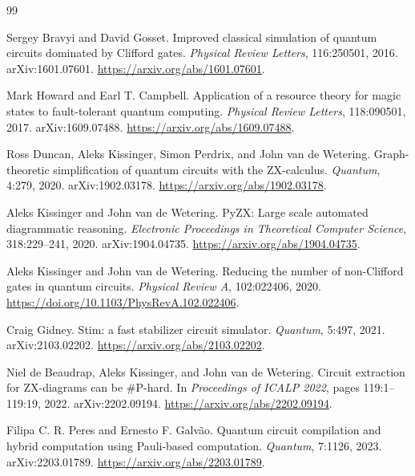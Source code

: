 \documentclass[11pt]{article}
\theoremstyle{remark}
\begin{document}
\begin{thebibliography}{99}

Sergey Bravyi and David Gosset.
\newblock Improved classical simulation of quantum circuits dominated by Clifford gates.
\newblock \emph{Physical Review Letters}, 116:250501, 2016.
\newblock arXiv:1601.07601.
\newblock \url{https://arxiv.org/abs/1601.07601}.

Mark Howard and Earl T. Campbell.
\newblock Application of a resource theory for magic states to fault-tolerant quantum computing.
\newblock \emph{Physical Review Letters}, 118:090501, 2017.
\newblock arXiv:1609.07488.
\newblock \url{https://arxiv.org/abs/1609.07488}.

Ross Duncan, Aleks Kissinger, Simon Perdrix, and John van de Wetering.
\newblock Graph-theoretic simplification of quantum circuits with the ZX-calculus.
\newblock \emph{Quantum}, 4:279, 2020.
\newblock arXiv:1902.03178.
\newblock \url{https://arxiv.org/abs/1902.03178}.

Aleks Kissinger and John van de Wetering.
\newblock PyZX: Large scale automated diagrammatic reasoning.
\newblock \emph{Electronic Proceedings in Theoretical Computer Science}, 318:229--241, 2020.
\newblock arXiv:1904.04735.
\newblock \url{https://arxiv.org/abs/1904.04735}.

Aleks Kissinger and John van de Wetering.
\newblock Reducing the number of non-Clifford gates in quantum circuits.
\newblock \emph{Physical Review A}, 102:022406, 2020.
\newblock \url{https://doi.org/10.1103/PhysRevA.102.022406}.

Craig Gidney.
\newblock Stim: a fast stabilizer circuit simulator.
\newblock \emph{Quantum}, 5:497, 2021.
\newblock arXiv:2103.02202.
\newblock \url{https://arxiv.org/abs/2103.02202}.

Niel de Beaudrap, Aleks Kissinger, and John van de Wetering.
\newblock Circuit extraction for ZX-diagrams can be \#P-hard.
\newblock In \emph{Proceedings of ICALP 2022}, pages 119:1--119:19, 2022.
\newblock arXiv:2202.09194.
\newblock \url{https://arxiv.org/abs/2202.09194}.

Filipa C. R. Peres and Ernesto F. Galv\~ao.
\newblock Quantum circuit compilation and hybrid computation using Pauli-based computation.
\newblock \emph{Quantum}, 7:1126, 2023.
\newblock arXiv:2203.01789.
\newblock \url{https://arxiv.org/abs/2203.01789}.


\end{thebibliography}
\end{document}
